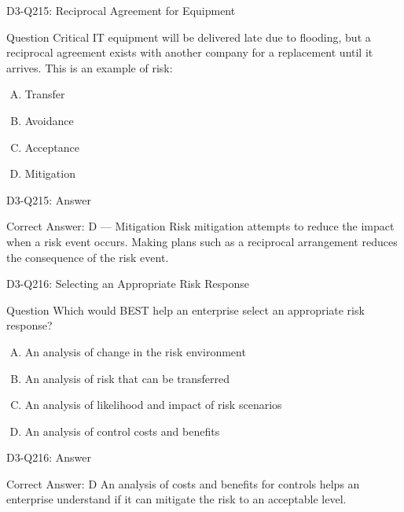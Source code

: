 \documentclass{beamer}
\begin{document}
	\begin{frame}{D3-Q215: Reciprocal Agreement for Equipment}
		\begin{block}{Question}
			Critical IT equipment will be delivered late due to flooding, but a reciprocal agreement exists with another company for a replacement until it arrives. This is an example of risk:
		\end{block}
		\begin{enumerate}[(A)]
			\item Transfer
			\item Avoidance
			\item Acceptance
			\item Mitigation
		\end{enumerate}
	\end{frame}
	\begin{frame}{D3-Q215: Answer}
		\begin{block}{Correct Answer: D --- Mitigation}
			Risk mitigation attempts to reduce the impact when a risk event occurs. Making plans such as a reciprocal arrangement reduces the consequence of the risk event.
		\end{block}
	\end{frame}
	
	\begin{frame}{D3-Q216: Selecting an Appropriate Risk Response}
		\begin{block}{Question}
			Which would BEST help an enterprise select an appropriate risk response?
		\end{block}
		\begin{enumerate}[(A)]
			\item An analysis of change in the risk environment
			\item An analysis of risk that can be transferred
			\item An analysis of likelihood and impact of risk scenarios
			\item An analysis of control costs and benefits
		\end{enumerate}
	\end{frame}
	\begin{frame}{D3-Q216: Answer}
		\begin{block}{Correct Answer: D}
			An analysis of costs and benefits for controls helps an enterprise understand if it can mitigate the risk to an acceptable level.
		\end{block}
	\end{frame}
	
\end{document}

